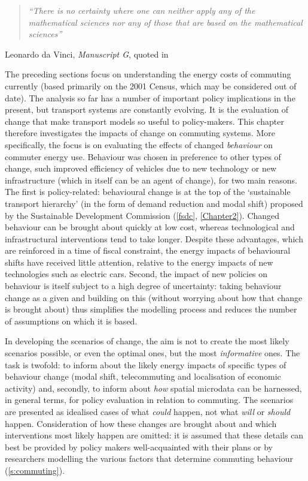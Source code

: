 \documentclass[a4paper, 11pt, twoside]{Thesis}
\begin{document}
\begin{quote}
\textit{``There is no certainty where one can neither apply any of the
mathematical sciences nor any of those that are based on the mathematical
sciences''}
\end{quote}
\begin{flushright}
Leonardo da Vinci, \emph{Manuscript G}, quoted in
\citep[p.~13]{rosci1978hidden}
\end{flushright}

The preceding sections focus on
understanding the energy costs of commuting currently (based primarily on the
2001 Census, which may be considered out of date). The analysis so far has a
number of important policy implications in the present, 
but transport systems are constantly evolving. It is the evaluation of
change
that make transport models so useful to policy-makers. This chapter
therefore 
investigates the impacts of change on commuting systems.
More specifically, the focus is on evaluating the effects of changed
\emph{behaviour} on commuter energy use.
Behaviour was chosen in preference to other types of change,
such improved efficiency of vehicles due to new technology or new
infrastructure (which in itself can be an agent of change), for two main
reasons. The first is policy-related:
behavioural change is at the top of the `sustainable transport
hierarchy' (in the form of demand reduction and modal shift) proposed by
the Sustainable Development Commission (\cref{fsdc}, \cref{Chapter2}).
Changed behaviour can be brought about quickly at low cost, whereas
technological and infrastructural interventions tend to take longer.
Despite these advantages, which are reinforced in a time of fiscal constraint,
the energy impacts of behavioural shifts have received little attention,
relative to the energy impacts of new technologies such as electric cars.
Second, the impact of new policies on behaviour is itself subject to a high
degree of uncertainty: taking behaviour change as a given and building
on this (without worrying about how that change is brought about)
thus simplifies the modelling process and reduces the number of assumptions
on which it is based. 

In developing the scenarios of change, the
aim is not to create the most likely scenarios possible, or even the
optimal ones, but the most \emph{informative} ones. The task is twofold:
to inform about the likely energy impacts of specific types of behaviour change
(modal shift, telecommuting and localisation of economic activity) and,
secondly, to inform about \emph{how} spatial microdata can be harnessed,
in general terms, for policy evaluation in relation to commuting. The scenarios
are presented as idealised cases of what \emph{could} happen, not what
\emph{will} or \emph{should} happen. Consideration of how these changes are
brought about and which interventions most likely happen are omitted: it is
assumed that these details can best be provided by policy makers well-acquainted
with their plans or by researchers modelling the various factors that determine
commuting behaviour (\cref{s:commuting}). 
\end{document}
